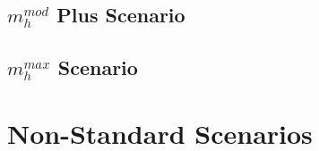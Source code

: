 \subsection{$m_h^{mod}$ Plus Scenario}


\subsection{$m_h^{max}$ Scenario}



\section{Non-Standard Scenarios}
\label{sec:interp_new_benchmark} 



